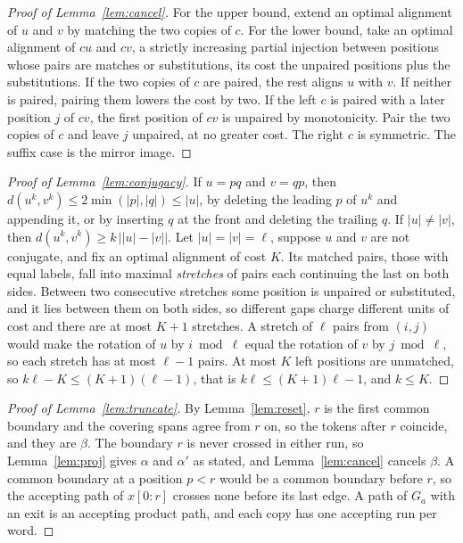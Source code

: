 \documentclass[11pt,a4paper]{article}
\theoremstyle{definition}
\theoremstyle{plain}
\begin{document}
\begin{proof}[Proof of Lemma~\ref{lem:cancel}]
For the upper bound, extend an optimal alignment of \(u\) and \(v\) by matching the two copies of \(c\). For the lower
bound, take an optimal alignment of \(cu\) and \(cv\), a strictly increasing partial injection between positions whose
pairs are matches or substitutions, its cost the unpaired positions plus the substitutions. If the two copies of \(c\)
are paired, the rest aligns \(u\) with \(v\). If neither is paired, pairing them lowers the cost by two. If the left
\(c\) is paired with a later position \(j\) of \(cv\), the first position of \(cv\) is unpaired by monotonicity. Pair
the two copies of \(c\) and leave \(j\) unpaired, at no greater cost. The right \(c\) is symmetric. The suffix case is
the mirror image.
\end{proof}

\begin{proof}[Proof of Lemma~\ref{lem:conjugacy}]
If \(u = pq\) and \(v = qp\), then \(d(u^k, v^k) \le 2\min(|p|, |q|) \le |u|\), by deleting the leading \(p\) of \(u^k\)
and appending it, or by inserting \(q\) at the front and deleting the trailing \(q\). If \(|u| \ne |v|\), then
\(d(u^k, v^k) \ge k\,\bigl||u| - |v|\bigr|\). Let \(|u| = |v| = \ell\), suppose \(u\) and \(v\) are not conjugate, and
fix an optimal alignment of cost \(K\). Its matched pairs, those with equal labels, fall into maximal \emph{stretches}
of pairs each continuing the last on both sides. Between two consecutive stretches some position is unpaired or
substituted, and it lies between them on both sides, so different gaps charge different units of cost and there are at
most \(K + 1\) stretches. A stretch of \(\ell\) pairs from \((i, j)\) would make the rotation of \(u\) by
\(i \bmod \ell\) equal the rotation of \(v\) by \(j \bmod \ell\), so each stretch has at most \(\ell - 1\) pairs. At
most \(K\) left positions are unmatched, so \(k\ell - K \le (K + 1)(\ell - 1)\), that is \(k\ell \le (K + 1)\ell - 1\),
and \(k \le K\).
\end{proof}

\begin{proof}[Proof of Lemma~\ref{lem:truncate}]
By Lemma~\ref{lem:reset}, \(r\) is the first common boundary and the covering spans agree from \(r\) on, so the tokens
after \(r\) coincide, and they are \(\beta\). The boundary \(r\) is never crossed in either run, so Lemma~\ref{lem:proj}
gives \(\alpha\) and \(\alpha'\) as stated, and Lemma~\ref{lem:cancel} cancels \(\beta\). A common boundary at a
position \(p < r\) would be a common boundary before \(r\), so the accepting path of \(x[0{:}r]\) crosses none before
its last edge. A path of \(G_a\) with an exit is an accepting product path, and each copy has one accepting run per
word.
\end{proof}
\end{document}
